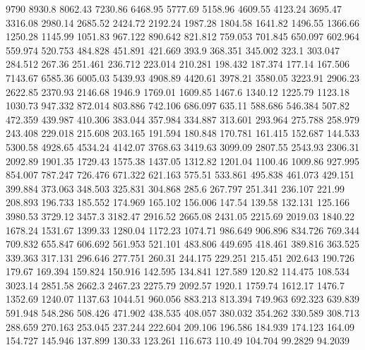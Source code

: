 9790      8930.8      8062.43      7230.86      6468.95      5777.69      5158.96      4609.55      4123.24      3695.47      3316.08      2980.14      2685.52      2424.72      2192.24      1987.28      1804.58      1641.82      1496.55      1366.66      1250.28      1145.99      1051.83      967.122      890.642      821.812      759.053      701.845      650.097      602.964      559.974      520.753      484.828      451.891      421.669      393.9      368.351      345.002      323.1      303.047      284.512      267.36      251.461      236.712      223.014      210.281      198.432      187.374      177.14      167.506      
7143.67      6585.36      6005.03      5439.93      4908.89      4420.61      3978.21      3580.05      3223.91      2906.23      2622.85      2370.93      2146.68      1946.9      1769.01      1609.85      1467.6      1340.12      1225.79      1123.18      1030.73      947.332      872.014      803.886      742.106      686.097      635.11      588.686      546.384      507.82      472.359      439.987      410.306      383.044      357.984      334.887      313.601      293.964      275.788      258.979      243.408      229.018      215.608      203.165      191.594      180.848      170.781      161.415      152.687      144.533      
5300.58      4928.65      4534.24      4142.07      3768.63      3419.63      3099.09      2807.55      2543.93      2306.31      2092.89      1901.35      1729.43      1575.38      1437.05      1312.82      1201.04      1100.46      1009.86      927.995      854.007      787.247      726.476      671.322      621.163      575.51      533.861      495.838      461.073      429.151      399.884      373.063      348.503      325.831      304.868      285.6      267.797      251.341      236.107      221.99      208.893      196.733      185.552      174.969      165.102      156.006      147.54      139.58      132.131      125.166      
3980.53      3729.12      3457.3      3182.47      2916.52      2665.08      2431.05      2215.69      2019.03      1840.22      1678.24      1531.67      1399.33      1280.04      1172.23      1074.71      986.649      906.896      834.726      769.344      709.832      655.847      606.692      561.953      521.101      483.806      449.695      418.461      389.816      363.525      339.363      317.131      296.646      277.751      260.31      244.175      229.251      215.451      202.643      190.726      179.67      169.394      159.824      150.916      142.595      134.841      127.589      120.82      114.475      108.534      
3023.14      2851.58      2662.3      2467.23      2275.79      2092.57      1920.1      1759.74      1612.17      1476.7      1352.69      1240.07      1137.63      1044.51      960.056      883.213      813.394      749.963      692.323      639.839      591.948      548.286      508.426      471.902      438.535      408.057      380.032      354.262      330.589      308.713      288.659      270.163      253.045      237.244      222.604      209.106      196.586      184.939      174.123      164.09      154.727      145.946      137.899      130.33      123.261      116.673      110.49      104.704      99.2829      94.2039      

